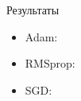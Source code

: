 \documentclass[aspectratio=169]{beamer}
\begin{document}
\begin{frame}{Результаты}
    
            \begin{itemize}
                \item Adam:   
                \item RMSprop: 
                \item SGD:        
            \end{itemize}
            
          
           
\end{frame}
\end{document}
